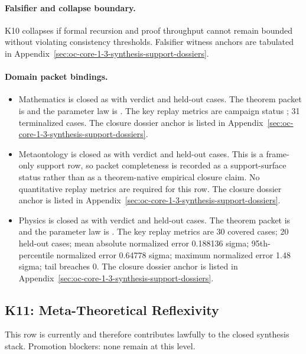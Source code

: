 \paragraph{Falsifier and collapse boundary.}
K10 collapses if formal recursion and proof throughput cannot remain bounded without violating consistency thresholds.
Falsifier witness anchors are tabulated in Appendix~\ref{sec:oc-core-1-3-synthesis-support-dossiers}.

\paragraph{Domain packet bindings.}
\begin{itemize}[leftmargin=1.6em,nosep]
\item Mathematics is closed as  with verdict  and  held-out cases. The theorem packet is  and the parameter law is . The key replay metrics are campaign status ; 31 terminalized cases. The closure dossier anchor is listed in Appendix~\ref{sec:oc-core-1-3-synthesis-support-dossiers}.
\item Metaontology is closed as  with verdict  and  held-out cases. This is a frame-only support row, so packet completeness is recorded as a support-surface status rather than as a theorem-native empirical closure claim. No quantitative replay metrics are required for this row. The closure dossier anchor is listed in Appendix~\ref{sec:oc-core-1-3-synthesis-support-dossiers}.
\item Physics is closed as  with verdict  and  held-out cases. The theorem packet is  and the parameter law is . The key replay metrics are 30 covered cases; 20 held-out cases; mean absolute normalized error 0.188136 sigma; 95th-percentile normalized error 0.64778 sigma; maximum normalized error 1.48 sigma; tail breaches 0. The closure dossier anchor is listed in Appendix~\ref{sec:oc-core-1-3-synthesis-support-dossiers}.
\end{itemize}

\subsection{K11: Meta-Theoretical Reflexivity}
\label{sec:oc-core-1-3-synthesis-k11}
This row is currently  and therefore contributes lawfully to the closed synthesis stack.
Promotion blockers: none remain at this level.

